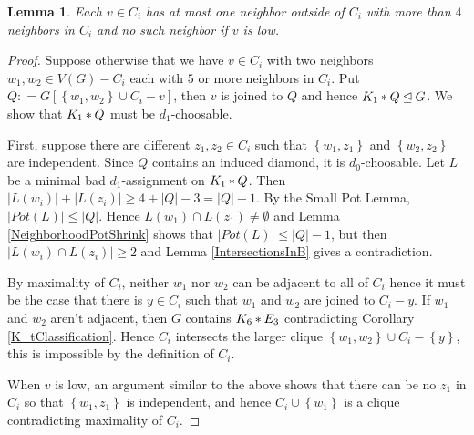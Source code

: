 \documentclass[12pt]{amsart}
\theoremstyle{plain}
\newtheorem{lem}[thm]{Lemma}
\theoremstyle{definition}
\theoremstyle{plain}
\newcommand{\set}[1]{\left\{ #1 \right\}}
\newcommand{\card}[1]{\left|#1\right|}
\newcommand{\join}[2]{#1 \mbox{\hspace{2 pt}$\ast$\hspace{2 pt}} #2}
\newcommand{\DefinedAs}{\mathrel{\mathop:}=}
\begin{document}
\begin{lem}\label{AtMostFourIn}
Each $v \in C_i$ has at most one
neighbor outside of $C_i$ with more than $4$ neighbors in $C_i$ and no such
neighbor if $v$ is low.
\end{lem}
\begin{proof}
Suppose otherwise that we have $v \in C_i$ with two neighbors $w_1, w_2 \in V(G)
- C_i$ each with $5$ or more neighbors in $C_i$.  Put $Q \DefinedAs
G[\set{w_1,w_2} \cup C_i - v]$, then $v$ is joined to $Q$ and hence
$\join{K_1}{Q} \unlhd G$.  We show that $\join{K_1}{Q}$ must be $d_1$-choosable. 

First, suppose there are different $z_1,z_2 \in C_i$ such that $\set{w_1, z_1}$
and $\set{w_2, z_2}$ are independent.  Since $Q$ contains an induced diamond,
it is $d_0$-choosable. Let $L$ be a minimal bad $d_1$-assignment on
$\join{K_1}{Q}$. Then $\card{L(w_i)} + \card{L(z_i)} \geq 4 + \card{Q} - 3 = \card{Q} + 1$.  By the Small Pot Lemma, $\card{Pot(L)} \leq \card{Q}$.  Hence
$L(w_1) \cap L(z_1) \neq \emptyset$ and Lemma \ref{NeighborhoodPotShrink} shows
that $\card{Pot(L)} \leq \card{Q} - 1$, but then $\card{L(w_i) \cap L(z_i)}
\geq 2$ and Lemma \ref{IntersectionsInB} gives a contradiction.

By maximality of $C_i$, neither $w_1$ nor $w_2$ can be adjacent to all of $C_i$
hence it must be the case that there is $y \in C_i$ such that $w_1$ and $w_2$
are joined to $C_i - y$.  If $w_1$ and $w_2$ aren't adjacent, then $G$ contains $\join{K_6}{E_3}$ contradicting Corollary \ref{K_tClassification}.  Hence $C_i$ intersects the larger clique $\set{w_1, w_2} \cup C_i - \set{y}$, this is impossible by the definition of $C_i$.

When $v$ is low, an argument similar to the above shows that there can be no
$z_1$ in $C_i$ so that $\set{w_1, z_1}$ is independent, and hence $C_i \cup
\set{w_1}$ is a clique contradicting maximality of $C_i$.
\end{proof}



\end{document}
